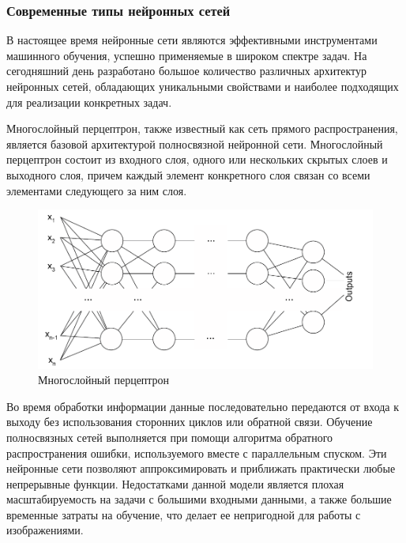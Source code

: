  \subsubsection{Современные типы нейронных сетей}
 
 В настоящее время нейронные сети являются эффективными инструментами машинного обучения, успешно применяемые в широком спектре задач\cite{haikin_neural}. На сегодняшний день разработано большое количество различных архитектур нейронных сетей, обладающих уникальными свойствами и наиболее подходящих для реализации конкретных задач.
 
 Многослойный перцептрон, также известный как сеть прямого распространения, является базовой архитектурой полносвязной нейронной сети. Многослойный перцептрон состоит из входного слоя, одного или нескольких скрытых слоев и выходного слоя, причем каждый элемент конкретного слоя связан со всеми элементами следующего за ним слоя.
 
\begin{figure}[h]
	\centering
	\includegraphics[width=0.7\linewidth]{images/MLP}
	\caption{Многослойный перцептрон}
	\label{fig:mlp}
\end{figure}

Во время обработки информации данные последовательно передаются от входа к выходу без использования сторонних циклов или обратной связи. Обучение полносвязных сетей выполняется при помощи алгоритма обратного распространения ошибки, используемого вместе с параллельным спуском.  Эти нейронные сети позволяют аппроксимировать и приближать практически любые непрерывные функции. Недостатками данной модели является плохая масштабируемость на задачи с большими входными данными, а также большие временные затраты на обучение, что делает ее непригодной для работы с изображениями.

